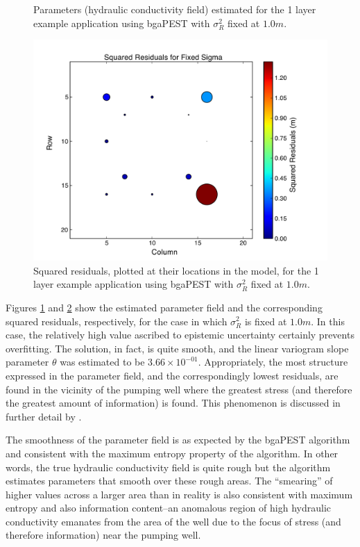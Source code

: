 \documentclass[11pt,oneside,onecolumn]{usgsreport}
\begin{document}
\begin{appendix}
\begin{figure}[H]
\caption{\label{fig:KL1-sigfixed}Parameters (hydraulic conductivity field)
estimated for the 1 layer example application using bgaPEST with $\sigma_{R}^{2}$
fixed at $1.0m$.}
\end{figure}


\begin{figure}[H]
\begin{center} \includegraphics[scale=0.4]{figures/1_layer_fixed_sigma_residuals}\end{center}

\caption{\label{fig:residL1-sigfixed}Squared residuals, plotted at their locations
in the model, for the 1 layer example application using bgaPEST with
$\sigma_{R}^{2}$ fixed at $1.0m$.}
\end{figure}


Figures \ref{fig:KL1-sigfixed} and \ref{fig:residL1-sigfixed} show
the estimated parameter field and the corresponding squared residuals,
respectively, for the case in which $\sigma_{R}^{2}$ is fixed at
$1.0m$. In this case, the relatively high value ascribed to epistemic
uncertainty certainly prevents overfitting. The solution, in fact,
is quite smooth, and the linear variogram slope parameter $\theta$
was estimated to be $3.66\times10^{-01}$. Appropriately, the most
structure expressed in the parameter field, and the correspondingly
lowest residuals, are found in the vicinity of the pumping well where
the greatest stress (and therefore the greatest amount of information)
is found. This phenomenon is discussed in further detail by \citet{FienenWRR2008}.

The smoothness of the parameter field is as expected by the bgaPEST
algorithm and consistent with the maximum entropy property of the
algorithm. In other words, the true hydraulic conductivity field is
quite rough but the algorithm estimates parameters that smooth over
these rough areas. The ``smearing'' of higher values across a larger
area than in reality is also consistent with maximum entropy and also
information content--an anomalous region of high hydraulic conductivity
emanates from the area of the well due to the focus of stress (and
therefore information) near the pumping well.


\end{appendix}
\end{document}
